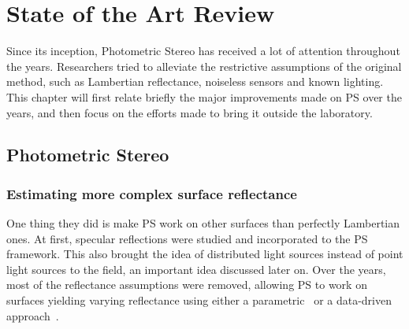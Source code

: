 
\chapter{State of the Art Review}
\label{c:sota}


Since its inception, Photometric Stereo has received a lot of attention throughout the years. Researchers tried to alleviate the restrictive assumptions of the original method, such as Lambertian reflectance, noiseless sensors and known lighting. This chapter will first relate briefly the major improvements made on PS over the years, and then focus on the efforts made to bring it outside the laboratory.


\section{Photometric Stereo}


\subsection{Estimating more complex surface reflectance}
One thing they did is make PS work on other surfaces than perfectly Lambertian ones. At first, specular reflections \cite{Ikeuchi1981} were studied and incorporated to the PS framework. This also brought the idea of distributed light sources instead of point light sources to the field, an important idea discussed later on. Over the years, most of the reflectance assumptions were removed, allowing PS to work on surfaces yielding varying reflectance using either a parametric~\cite{hertzmann-pami-05,goldman-tpami-10} or a data-driven approach~\cite{alldrin-cvpr-08}.

